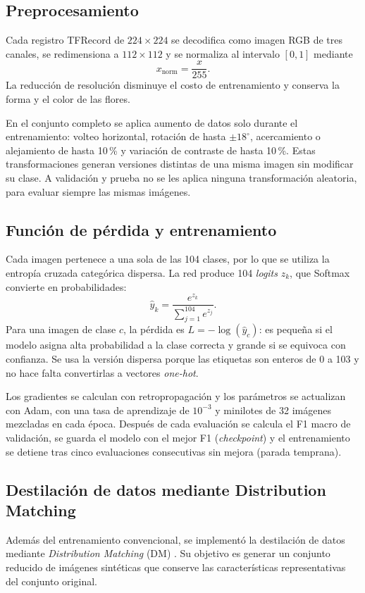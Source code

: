 \subsection{Preprocesamiento}
Cada registro TFRecord de $224\times224$ se decodifica como imagen RGB de tres canales, se redimensiona a $112\times112$ y se normaliza al intervalo $[0,1]$ mediante
\begin{equation}
x_{\text{norm}} = \frac{x}{255}.
\end{equation}
La reducción de resolución disminuye el costo de entrenamiento y conserva la forma y el color de las flores.

En el conjunto completo se aplica aumento de datos solo durante el entrenamiento: volteo horizontal, rotación de hasta $\pm18^\circ$, acercamiento o alejamiento de hasta 10\,\% y variación de contraste de hasta 10\,\%. Estas transformaciones generan versiones distintas de una misma imagen sin modificar su clase. A validación y prueba no se les aplica ninguna transformación aleatoria, para evaluar siempre las mismas imágenes.

\subsection{Función de pérdida y entrenamiento}
Cada imagen pertenece a una sola de las 104 clases, por lo que se utiliza la entropía cruzada categórica dispersa. La red produce 104 \textit{logits} $z_k$, que Softmax convierte en probabilidades:
\begin{equation}
\hat{y}_k = \frac{e^{z_k}}{\sum_{j=1}^{104} e^{z_j}}.
\end{equation}
Para una imagen de clase $c$, la pérdida es $L = -\log(\hat{y}_c)$: es pequeña si el modelo asigna alta probabilidad a la clase correcta y grande si se equivoca con confianza. Se usa la versión dispersa porque las etiquetas son enteros de 0 a 103 y no hace falta convertirlas a vectores \textit{one-hot}.

Los gradientes se calculan con retropropagación y los parámetros se actualizan con Adam, con una tasa de aprendizaje de $10^{-3}$ y minilotes de 32 imágenes mezcladas en cada época. Después de cada evaluación se calcula el F1 macro de validación, se guarda el modelo con el mejor F1 (\textit{checkpoint}) y el entrenamiento se detiene tras cinco evaluaciones consecutivas sin mejora (parada temprana).

\subsection{Destilación de datos mediante Distribution Matching}
Además del entrenamiento convencional, se implementó la destilación de datos mediante \textit{Distribution Matching} (DM) \parencite{zhao2023dm}. Su objetivo es generar un conjunto reducido de imágenes sintéticas que conserve las características representativas del conjunto original.

